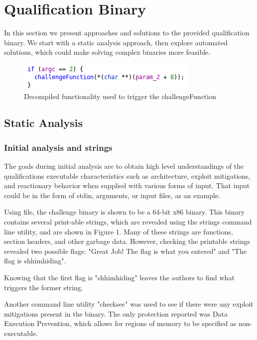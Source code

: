\documentclass[conference]{IEEEtran}
\begin{document}
\section{Qualification Binary}
\label{sec:attacks}

In this section we present approaches and solutions to the provided qualification binary. We start with a static analysis approach, then explore automated solutions, which could make solving complex binaries more feasible. 
\begin{figure}
    \centering
    \includegraphics{argc.png}
    \caption{Decompiled functionality used to trigger the challengeFunction}
    \label{fig:my_label}
\end{figure}
\subsection{Static Analysis}
\subsubsection{Initial analysis and strings}
The goals during initial analysis are to obtain high level understandings of the qualifications executable characteristics such as architecture, exploit mitigations, and reactionary behavior when supplied with various forms of input. That input could be in the form of stdin, arguments, or input files, as an example.

Using file, the challenge binary is shown to be a 64-bit x86 binary. This binary contains several print-able strings, which are revealed using the strings command line utility, and are shown in Figure 1. Many of these strings are functions, section headers, and other garbage data. However, checking the printable strings revealed two possible flags: "Great Job! The flag is what you entered" and "The flag is shhimhiding". 

Knowing that the first flag is "shhimhiding" leaves the authors to find what triggers the former string.



Another command line utility "checksec" was used to see if there were any exploit mitigations present in the binary. The only protection reported was Data Execution Prevention, which allows for regions of memory to be specified as non-executable.
\end{document}
